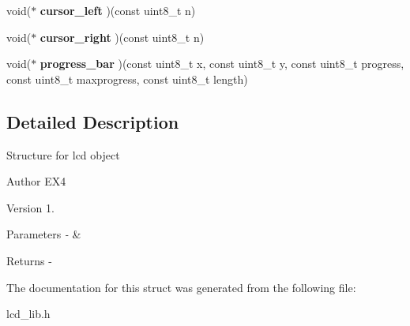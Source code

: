 \begin{DoxyCompactItemize}
\item 
\hypertarget{structlcd__struct_a5c731c387a750aa0d472012e10d1afd4}{void($\ast$ {\bfseries cursor\-\_\-left} )(const uint8\-\_\-t n)}\label{structlcd__struct_a5c731c387a750aa0d472012e10d1afd4}

\item 
\hypertarget{structlcd__struct_a29efbd21502692e0189242bbf3bc693e}{void($\ast$ {\bfseries cursor\-\_\-right} )(const uint8\-\_\-t n)}\label{structlcd__struct_a29efbd21502692e0189242bbf3bc693e}

\item 
\hypertarget{structlcd__struct_a7dc17d7e36527614bb866be7bfe7d2dd}{void($\ast$ {\bfseries progress\-\_\-bar} )(const uint8\-\_\-t x, const uint8\-\_\-t y, const uint8\-\_\-t progress, const uint8\-\_\-t maxprogress, const uint8\-\_\-t length)}\label{structlcd__struct_a7dc17d7e36527614bb866be7bfe7d2dd}

\end{DoxyCompactItemize}


\subsection{Detailed Description}
Structure for lcd object \begin{DoxyAuthor}{Author}
E\-X4 
\end{DoxyAuthor}
\begin{DoxyVersion}{Version}
1. 
\end{DoxyVersion}

\begin{DoxyParams}{Parameters}
{\em -\/} & \\
\hline
\end{DoxyParams}
\begin{DoxyReturn}{Returns}
-\/ 
\end{DoxyReturn}


The documentation for this struct was generated from the following file\-:\begin{DoxyCompactItemize}
\item 
lcd\-\_\-lib.\-h\end{DoxyCompactItemize}

